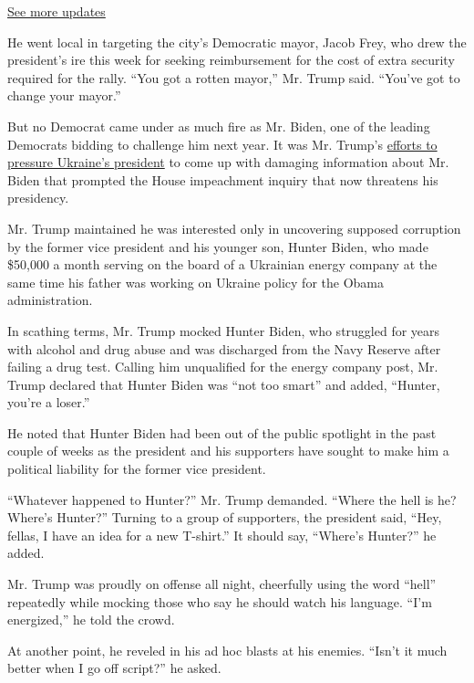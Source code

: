 \href{https://www.nytimes.com/2020/07/31/us/elections/biden-vs-trump.html?action=click\&pgtype=Article\&state=default\&region=MAIN_CONTENT_1\&context=storylines_live_updates}{See
more updates}

He went local in targeting the city's Democratic mayor, Jacob Frey, who
drew the president's ire this week for seeking reimbursement for the
cost of extra security required for the rally. ``You got a rotten
mayor,'' Mr. Trump said. ``You've got to change your mayor.''

But no Democrat came under as much fire as Mr. Biden, one of the leading
Democrats bidding to challenge him next year. It was Mr. Trump's
\href{https://www.nytimes.com/2019/09/25/us/politics/ukraine-transcript-trump.html}{efforts
to pressure Ukraine's president} to come up with damaging information
about Mr. Biden that prompted the House impeachment inquiry that now
threatens his presidency.

Mr. Trump maintained he was interested only in uncovering supposed
corruption by the former vice president and his younger son, Hunter
Biden, who made \$50,000 a month serving on the board of a Ukrainian
energy company at the same time his father was working on Ukraine policy
for the Obama administration.

In scathing terms, Mr. Trump mocked Hunter Biden, who struggled for
years with alcohol and drug abuse and was discharged from the Navy
Reserve after failing a drug test. Calling him unqualified for the
energy company post, Mr. Trump declared that Hunter Biden was ``not too
smart'' and added, ``Hunter, you're a loser.''

He noted that Hunter Biden had been out of the public spotlight in the
past couple of weeks as the president and his supporters have sought to
make him a political liability for the former vice president.

``Whatever happened to Hunter?'' Mr. Trump demanded. ``Where the hell is
he? Where's Hunter?'' Turning to a group of supporters, the president
said, ``Hey, fellas, I have an idea for a new T-shirt.'' It should say,
``Where's Hunter?'' he added.

Mr. Trump was proudly on offense all night, cheerfully using the word
``hell'' repeatedly while mocking those who say he should watch his
language. ``I'm energized,'' he told the crowd.

At another point, he reveled in his ad hoc blasts at his enemies.
``Isn't it much better when I go off script?'' he asked.

